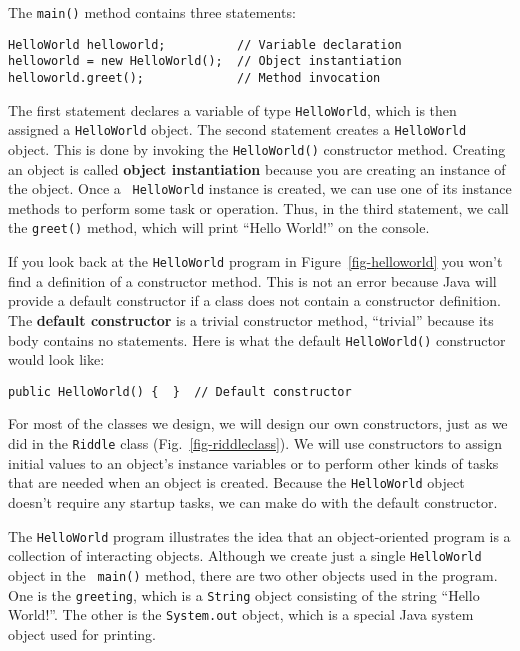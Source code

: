 The {\tt main()} method contains three statements:

\begin{jjjlisting}
\begin{lstlisting}
HelloWorld helloworld;          // Variable declaration
helloworld = new HelloWorld();  // Object instantiation
helloworld.greet();             // Method invocation
\end{lstlisting}
\end{jjjlisting}

\noindent The first statement declares a variable of type 
{\tt HelloWorld}, which is then assigned a {\tt HelloWorld} object. 
The second statement creates a {\tt HelloWorld}
object. This is done by invoking the {\tt HelloWorld()} constructor
method. Creating an object is called {\bf object instantiation}
because you are creating an instance of the object.  Once a {\tt
HelloWorld} instance is created, we can use one of its instance
methods to perform some task or operation. Thus, in the third
statement, we call the {\tt greet()} method, which will print ``Hello
World!'' on the console.

If you look back at the {\tt HelloWorld} program in
Figure~\ref{fig-helloworld} you won't find a definition of a
constructor method.  This is not an error because Java will provide a
default constructor if a class does not contain a constructor
definition. The {\bf default constructor} is a trivial constructor
method, ``trivial'' because its body contains no statements. Here
is what the default {\tt HelloWorld()} constructor would look like:

\begin{jjjlisting}
\begin{lstlisting}
public HelloWorld() {  }  // Default constructor
\end{lstlisting}
\end{jjjlisting}

\noindent For most of the classes we design, we will design our
own constructors, just as we did in the {\tt Riddle} class
(Fig.~\ref{fig-riddleclass}).  We will use constructors to assign
initial values to an object's instance variables or to perform other
kinds of tasks that are needed when an object is created. Because the
{\tt HelloWorld} object doesn't require any startup tasks, we can make
do with the default constructor.

The {\tt HelloWorld} program illustrates the idea that an
object-oriented program is a collection of interacting objects.
Although we create just a single {\tt HelloWorld} object in the {\tt
main()} method, there are two other objects used in the program. One
is the {\tt greeting}, which is a {\tt String} object consisting of
the string ``Hello World!''.  The other is the {\tt System.out}
object, which is a special Java system object used for printing.
	

